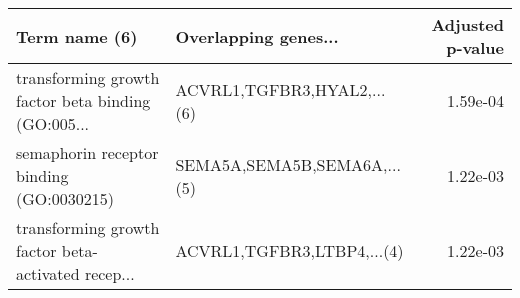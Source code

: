 \begin{tabular}{llr}
\toprule
                                     Term name (6) &        Overlapping genes... &  Adjusted p-value \\
\midrule
transforming growth factor beta binding (GO:005... &  ACVRL1,TGFBR3,HYAL2,...(6) &          1.59e-04 \\
          semaphorin receptor binding (GO:0030215) & SEMA5A,SEMA5B,SEMA6A,...(5) &          1.22e-03 \\
transforming growth factor beta-activated recep... &  ACVRL1,TGFBR3,LTBP4,...(4) &          1.22e-03 \\
\bottomrule
\end{tabular}
